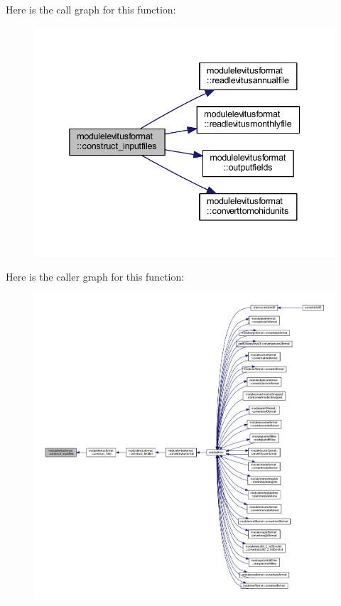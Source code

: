 Here is the call graph for this function\+:\nopagebreak
\begin{figure}[H]
\begin{center}
\leavevmode
\includegraphics[width=338pt]{namespacemodulelevitusformat_a3771e94f5b1b7829553eba0cea20546a_cgraph}
\end{center}
\end{figure}
Here is the caller graph for this function\+:\nopagebreak
\begin{figure}[H]
\begin{center}
\leavevmode
\includegraphics[width=350pt]{namespacemodulelevitusformat_a3771e94f5b1b7829553eba0cea20546a_icgraph}
\end{center}
\end{figure}
\mbox{\label{namespacemodulelevitusformat_a8d2f6c0620be1ea52eadbd9f59b02100}} 
